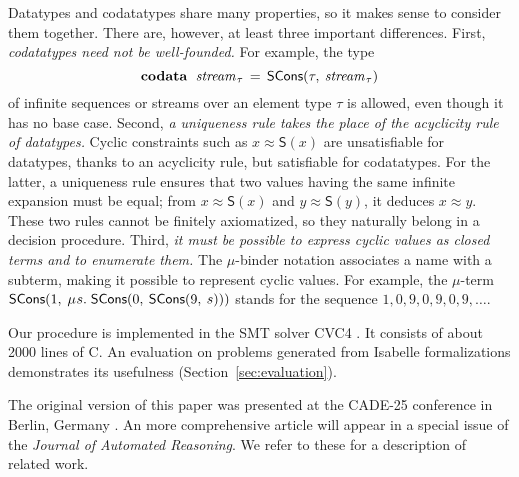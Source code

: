 \documentclass[letter]{article}
\newcommand\MU{\vvthinspace\mu\vvthinspace}
\theoremstyle{plain}
\theoremstyle{definition}
\newcommand\cpp{C\nobreak\raisebox{.05ex}{+}\nobreak\raisebox{.05ex}{+}}
\newcommand\keyw[1]{\textbf{#1}}
\newcommand\const[1]{\textsf{#1}}
\newcommand\ty[1]{\textit{#1}}
\newcommand{\teq}{\approx}
\newcommand\vvthinspace{\kern+0.041667em}
\newcommand\vthinspace{\kern+0.083333em}
\begin{document}
Datatypes and codatatypes share many properties, so it makes sense
to consider them together. There are, however, at least three important
differences.
%
First, \emph{codatatypes need not be well-founded.}
For example, the type
$$\vthinspace\keyw{codata}~\;\ty{stream}_{\vthinspace\tau} \,=\allowbreak\, \const{SCons}(\tau,\allowbreak\: \ty{stream}_{\vthinspace\tau})\vthinspace$$
of infinite sequences or streams over an element type $\tau$ is
allowed, even though it has no base case.
Second, \emph{a uniqueness rule takes the place of the acyclicity rule of datatypes.}
Cyclic constraints such as
$x \teq \const{S}(x)$ %
are unsatisfiable for datatypes,
thanks to an acyclicity rule,
but satisfiable for codatatypes. 
For the latter, a uniqueness rule ensures that two values
having the same infinite expansion must be equal; from $x
\teq \const{S}(x)$ and
$y \teq \const{S}(y)$, it deduces $x \teq y$.
These two rules cannot be finitely axiomatized, so they naturally belong in
a decision procedure.
%
Third, \emph{it must be possible to express cyclic values as closed terms and
to enumerate them.} %
The \hbox{$\mu$-binder} notation associates a name with
a subterm, making it possible to represent cyclic values.
For example,
the $\mu$-term $\const{SCons}(1,\: \MU s.\; \const{SCons}(0,\: \const{SCons}(9,\: s)))$
stands for the %
sequence $1, 0, 9, 0, 9, 0, 9, \dotsc$.


Our procedure is implemented in the SMT solver CVC4 \cite{barrett-et-al-2011}. 
It consists of about 2000 lines of \cpp{}. %
%
An evaluation on %
problems generated from Isabelle
formalizations demonstrates its usefulness (Section~\ref{sec:evaluation}).

The original version of this paper was presented at the CADE-25 conference in
Berlin, Germany \cite{reynolds-blanchette-2015-codata}. An more comprehensive
article %
will appear in a special issue of the
\emph{Journal of Automated Reasoning}. We refer to these for a description of
related work.
\end{document}
